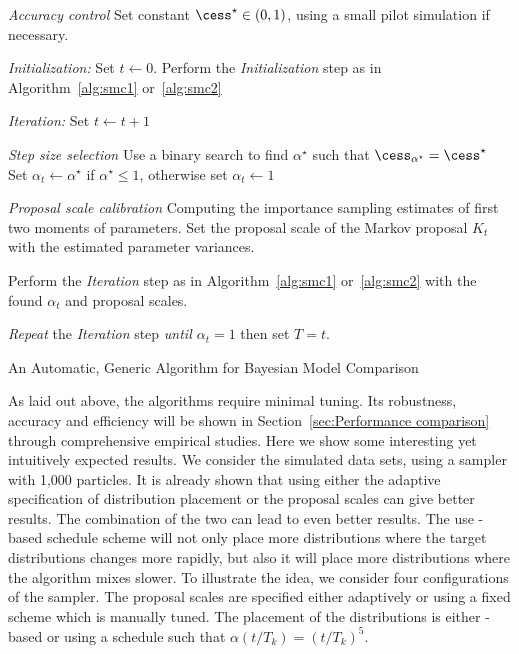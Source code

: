 \begin{algorithm}
\begin{algorithmic}
  \tophrule
  \STATE \emph{Accuracy control}
  \STATE\STATESKIP Set constant $\cess^\star\in(0,1)$, using a small pilot
  simulation if necessary.

  \STATE \emph{Initialization:} Set $t\leftarrow0$.
  \STATE\STATESKIP Perform the \emph{Initialization} step
    as in Algorithm~\ref{alg:smc1} or~\ref{alg:smc2}

  \STATE \emph{Iteration:} Set $t\leftarrow t + 1$

  \STATE\STATESKIP \emph{Step size selection}
  \STATE\STATESKIP\STATESKIP Use a binary search %
  to find $\alpha^\star$ such that $\cess_{\alpha^\star} = \cess^\star$
  \STATE\STATESKIP\STATESKIP Set $\alpha_t \leftarrow\alpha^\star$ if
    $\alpha^\star \le 1$, otherwise set $\alpha_t\leftarrow1$

  \STATE\STATESKIP \emph{Proposal scale calibration}
  \STATE\STATESKIP\STATESKIP
  Computing the importance sampling estimates of first two moments of
  parameters.
  \STATE\STATESKIP\STATESKIP
  Set the proposal scale of the Markov proposal $K_t$ with the estimated
  parameter variances.

  \STATE\STATESKIP Perform the \emph{Iteration} step as in
  Algorithm~\ref{alg:smc1} or~\ref{alg:smc2} with the found $\alpha_t$
  and proposal scales.

  \STATE \emph{Repeat} the \emph{Iteration} step %
    \emph{until $\alpha_t = 1$} then set $T=t$.
  \bottomhrule
\end{algorithmic}
\caption{An Automatic, Generic Algorithm for Bayesian Model Comparison}
\label{alg:adaptive}
\end{algorithm}

As laid out above, the algorithms require minimal tuning. Its robustness,
accuracy and efficiency will be shown in Section~\ref{sec:Performance
  comparison} through comprehensive empirical studies. Here we show some
interesting yet intuitively expected results. We consider the simulated \pet
data sets, using a \smc[2] sampler with 1,000 particles. It is already shown
that using either the adaptive specification of distribution placement or the
\mcmc proposal scales can give better results. The combination of the two can
lead to even better results. The use \cess-based schedule scheme will not only
place more distributions where the target distributions changes more rapidly,
but also it will place more distributions where the \mcmc algorithm mixes
slower. To illustrate the idea, we consider four configurations of the
sampler. The proposal scales are specified either adaptively or using a fixed
scheme which is manually tuned. The placement of the distributions is either
\cess-based or using a schedule such that $\alpha(t/T_k) = (t/T_k)^5$.

